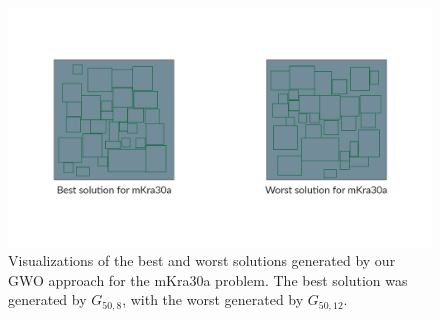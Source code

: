 \begin{figure}[h!]
\centering
\begin{adjustwidth}{-0.45in}{}
	\includegraphics[scale=1.0]{./images/chap07-rd/gwo-mkra30a-best-and-worst-solutions.png}
\end{adjustwidth}
\caption{Visualizations of the best and worst solutions generated by our GWO approach for the mKra30a problem. The best solution was generated by $G_{50,8}$, with the worst generated by $G_{50,12}$.}
\label{approach-gwo-mkra30a-best-and-worst-solutions-visualization}
\end{figure}

